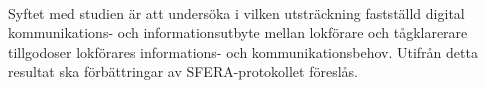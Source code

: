 \paragraph{}
\hspace{-11pt}Syftet med studien är att undersöka i vilken utsträckning fastställd digital kommunikations- och informationsutbyte mellan lokförare och tågklarerare tillgodoser lokförares informations- och kommunikationsbehov.
Utifrån detta resultat ska förbättringar av SFERA-protokollet föreslås.
